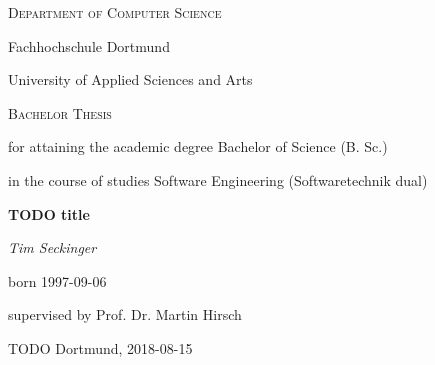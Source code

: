{\centering
  {\small\scshape Department of Computer Science \par}
  {\large Fachhochschule Dortmund \par}
  {\large University of Applied Sciences and Arts \par}

  \vspace{10mm}

  {\large\scshape Bachelor Thesis\par}
  \vspace{5mm}
  {\small
  for attaining the academic degree Bachelor of Science (B. Sc.)\par
  in the course of studies Software Engineering (Softwaretechnik dual)\par
  }

  \vspace{20mm}

  {\huge\bfseries TODO title \par}

  \vspace{20mm}

  {\large\itshape
  Tim Seckinger\par
  \small born 1997-09-06\par
  }
  \vspace{5mm}
  {\small supervised by Prof. Dr. Martin Hirsch\par}

  \vfill

  {\large TODO Dortmund, 2018-08-15}
}
